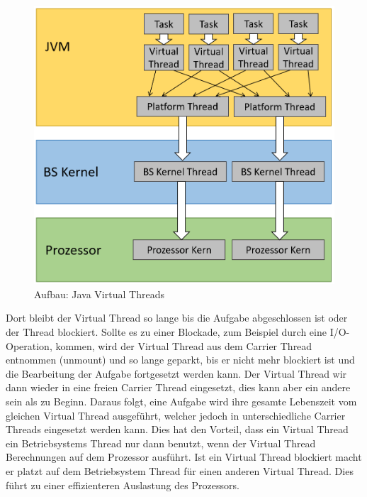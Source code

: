 \documentclass[fontsize=12pt,paper=a4,twoside=semi,parskip=half-,headsepline,headinclude]{scrreprt}
\begin{document}
\begin{figure}[h]
	\centering
	\includegraphics[scale=0.5]{figures/VirtualThreads.png}
	\caption{Aufbau: Java Virtual Threads}
	\label{fig:VirtualThreads}
\end{figure}


Dort bleibt der Virtual Thread so lange bis die Aufgabe abgeschlossen ist oder der Thread blockiert. Sollte es zu einer Blockade, zum Beispiel durch eine I/O-Operation, kommen, wird der Virtual Thread aus dem Carrier Thread entnommen (unmount) und so lange geparkt, bis er nicht mehr blockiert ist und die Bearbeitung der Aufgabe fortgesetzt werden kann. Der Virtual Thread wir dann wieder in eine freien Carrier Thread eingesetzt, dies kann aber ein andere sein als zu Beginn. Daraus folgt, eine Aufgabe wird ihre gesamte Lebenszeit vom gleichen Virtual Thread ausgeführt, welcher jedoch in unterschiedliche Carrier Threads eingesetzt werden kann. Dies hat den Vorteil, dass ein Virtual Thread ein Betriebsystems Thread nur dann benutzt, wenn der Virtual Thread Berechnungen auf dem Prozessor ausführt. Ist ein Virtual Thread blockiert macht er platzt auf dem Betriebsystem Thread für einen anderen Virtual Thread. Dies führt zu einer effizienteren Auslastung des Prozessors.\cite{Bateman2023}
\end{document}
